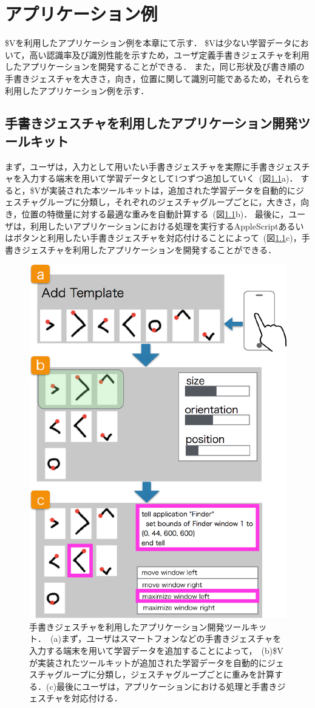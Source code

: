 \chapter{アプリケーション例}
\$Vを利用したアプリケーション例を本章にて示す．
\$Vは少ない学習データにおいて，高い認識率及び識別性能を示すため，ユーザ定義手書きジェスチャを利用したアプリケーションを開発することができる．
また，同じ形状及び書き順の手書きジェスチャを大きさ，向き，位置に関して識別可能であるため，それらを利用したアプリケーション例を示す．

\section{手書きジェスチャを利用したアプリケーション開発ツールキット}
まず，ユーザは，入力として用いたい手書きジェスチャを実際に手書きジェスチャを入力する端末を用いて学習データとして1つずつ追加していく~(図\ref{fig:flow}a)．
すると，\$Vが実装された本ツールキットは，追加された学習データを自動的にジェスチャグループに分類し，それぞれのジェスチャグループごとに，大きさ，向き，位置の特徴量に対する最適な重みを自動計算する~(図\ref{fig:flow}b)．
最後に，ユーザは，利用したいアプリケーションにおける処理を実行するAppleScriptあるいはボタンと利用したい手書きジェスチャを対応付けることによって~(図\ref{fig:flow}c)，手書きジェスチャを利用したアプリケーションを開発することができる．

\begin{figure} [h!]
	\begin{center}
		\includegraphics [width=0.7\hsize ]{img/flow.eps}
	\end{center}
	\caption{手書きジェスチャを利用したアプリケーション開発ツールキット．~(a)まず，ユーザはスマートフォンなどの手書きジェスチャを入力する端末を用いて学習データを追加することによって，~(b)\$Vが実装されたツールキットが追加された学習データを自動的にジェスチャグループに分類し，ジェスチャグループごとに重みを計算する．(c)最後にユーザは，アプリケーションにおける処理と手書きジェスチャを対応付ける．}
	\label{fig:flow}
\end{figure}

